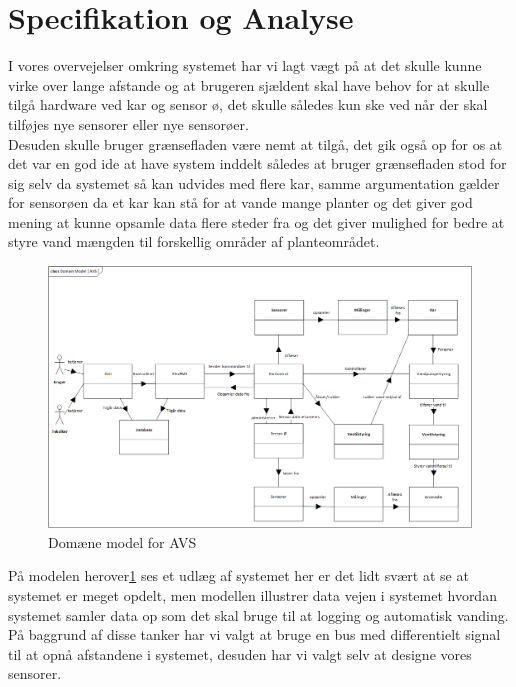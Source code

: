 \section{Specifikation og Analyse}
I vores overvejelser omkring systemet har vi lagt vægt på at det skulle kunne virke over lange afstande og at brugeren sjældent skal have behov for at skulle tilgå hardware ved kar og sensor ø, det skulle således kun ske ved når der skal tilføjes nye sensorer eller nye sensorøer. \\
Desuden skulle bruger grænsefladen være nemt at tilgå, det gik også op for os at det var en god ide at have system inddelt således at bruger grænsefladen stod for sig selv da systemet så kan udvides med flere kar, samme argumentation gælder for sensorøen da et kar kan stå for at vande mange planter og det giver god mening at kunne opsamle data flere steder fra og det giver mulighed for bedre at styre vand mængden til forskellig områder af planteområdet.

\begin{figure}[H]
	\centering
	\includegraphics[width=1\textwidth]{Projektbeskrivelse/SpecifikationOgAnalyse/System_Domain_Model.png}
	\caption{Domæne model for AVS}
	\label{fig:DomaeneSys}
\end{figure} 

På modelen herover\ref{fig:DomaeneSys} ses et udlæg af systemet her er det lidt svært at se at systemet er meget opdelt, men modellen illustrer data vejen i systemet hvordan systemet samler data op som det skal bruge til at logging og automatisk vanding.
\\
På baggrund af disse tanker har vi valgt at bruge en bus med differentielt signal til at opnå afstandene i systemet, desuden har vi valgt selv at designe vores sensorer.